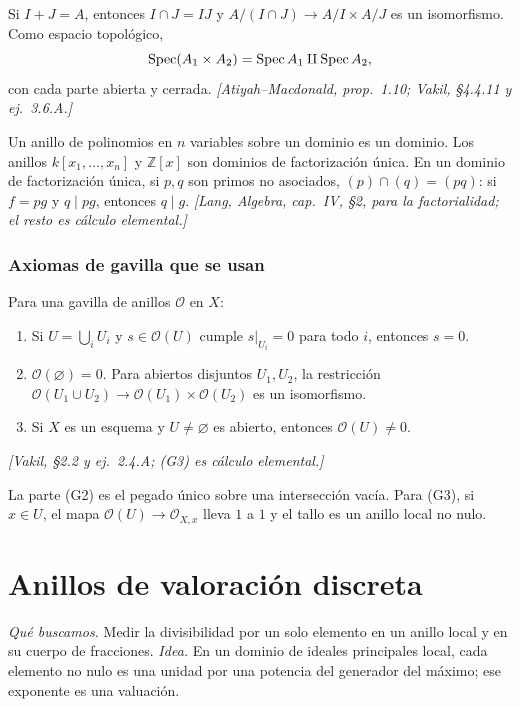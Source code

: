 \begin{prop}
\label{prop:s09-productos-chino}
Si $I+J=A$, entonces $I\cap J=IJ$ y $A/(I\cap J)\to A/I\times A/J$ es un isomorfismo. Como espacio topológico,
\[
\operatorname{Spec}(A_1\times A_2)=\operatorname{Spec} A_1\amalg\operatorname{Spec} A_2,
\]
con cada parte abierta y cerrada. \emph{[Atiyah--Macdonald, prop.~1.10; Vakil, \S4.4.11 y ej.~3.6.A.]}
\end{prop}

\begin{prop}[Polinomios]
\label{prop:s09-polinomios}
Un anillo de polinomios en $n$ variables sobre un dominio es un dominio. Los anillos $k[x_1,\ldots,x_n]$ y $\mathbb Z[x]$ son dominios de factorización única. En un dominio de factorización única, si $p,q$ son primos no asociados, $(p)\cap(q)=(pq)$: si $f=pg$ y $q\mid pg$, entonces $q\mid g$. \emph{[Lang, \emph{Algebra}, cap.~IV, \S2, para la factorialidad; el resto es cálculo elemental.]}
\end{prop}

\subsubsection{Axiomas de gavilla que se usan}

\begin{prop}
\label{prop:s09-axiomas-gavilla}
Para una gavilla de anillos $\mathcal O$ en $X$:
\begin{enumerate}[label=(G\arabic*)]
\item Si $U=\bigcup_iU_i$ y $s\in\mathcal O(U)$ cumple $s|_{U_i}=0$ para todo $i$, entonces $s=0$.
\item $\mathcal O(\varnothing)=0$. Para abiertos disjuntos $U_1,U_2$, la restricción $\mathcal O(U_1\cup U_2)\to\mathcal O(U_1)\times\mathcal O(U_2)$ es un isomorfismo.
\item Si $X$ es un esquema y $U\ne\varnothing$ es abierto, entonces $\mathcal O(U)\ne0$.
\end{enumerate}
\emph{[Vakil, \S2.2 y ej.~2.4.A; (G3) es cálculo elemental.]}
\end{prop}
La parte (G2) es el pegado único sobre una intersección vacía. Para (G3), si $x\in U$, el mapa $\mathcal O(U)\to\mathcal O_{X,x}$ lleva $1$ a $1$ y el tallo es un anillo local no nulo.

\section{Anillos de valoración discreta}
\emph{Qué buscamos.} Medir la divisibilidad por un solo elemento en un anillo local y en su cuerpo de fracciones. \emph{Idea.} En un dominio de ideales principales local, cada elemento no nulo es una unidad por una potencia del generador del máximo; ese exponente es una valuación.

